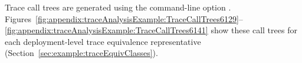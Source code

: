 \enlargethispage{1.2cm}

Trace call trees are generated using the command-line option \OPT{\OPTplotCallTrees}. %
Figures~\ref{fig:appendix:traceAnalysisExample:TraceCallTrees6129}--\ref{fig:appendix:traceAnalysisExample:TraceCallTrees6141} %
show these call trees for each deployment-level %
trace equivalence representative (Section~\ref{sec:example:traceEquivClasses}).

\begin{figure}[h]\centering
{}
\subfigure[Trace \ldots{}6130]{\label{fig:appendix:traceAnalysisExample:TraceCallTrees6130}%
}
\end{figure}
